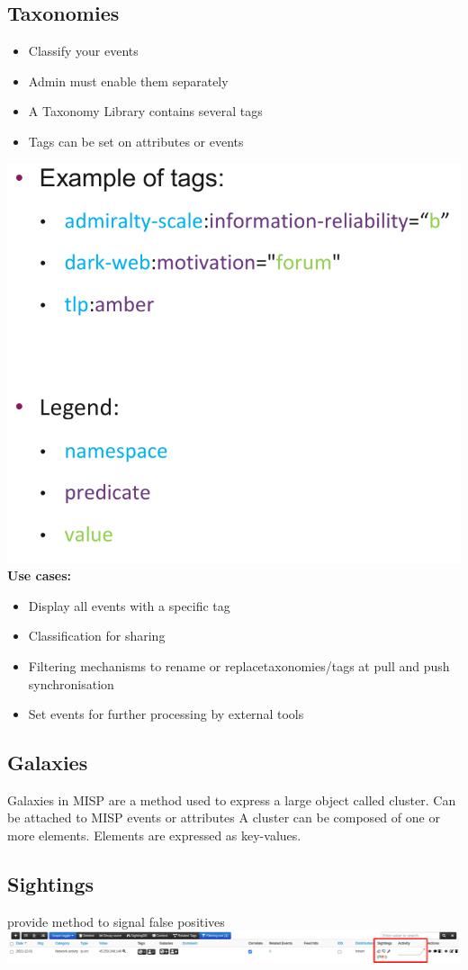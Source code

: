 \subsection{Taxonomies}
\begin{itemize}
    \item Classify your events
    \item Admin must enable them separately
    \item A Taxonomy Library contains several tags
    \item Tags can be set on attributes or events\\
\end{itemize}
\includegraphics[width=.7\linewidth]{./img/15-misp/misp_tag}\\
\textbf{Use cases:}
\begin{itemize}
    \item Display all events with a specific tag
    \item Classification for sharing
    \item Filtering mechanisms to rename or replacetaxonomies/tags at pull and push synchronisation
    \item Set events for further processing by external tools
\end{itemize}

\columnbreak

\subsection{Galaxies}
Galaxies in MISP are a method used to express a large object called cluster.
Can be attached to MISP events or attributes
A cluster can be composed of one or more elements.
Elements are expressed as key-values.
\subsection{Sightings}
provide method to signal false positives\\
\includegraphics[width=\linewidth]{./img/15-misp/sightings.png}
